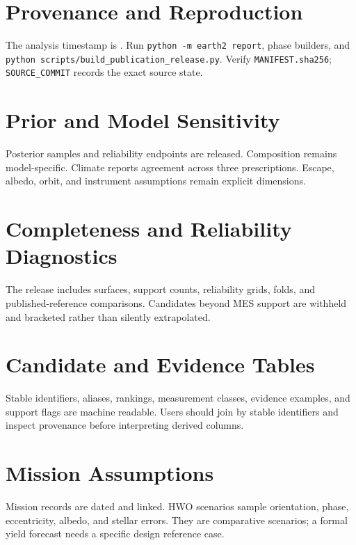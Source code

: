 \documentclass[11pt]{article}
\begin{document}
\section{Provenance and Reproduction}
The analysis timestamp is \texttt{\AnalysisTimestamp}. Run
\texttt{python -m earth2 report}, phase builders, and
\texttt{python scripts/build\_publication\_release.py}. Verify
\texttt{MANIFEST.sha256}; \texttt{SOURCE\_COMMIT} records the exact source state.

\section{Prior and Model Sensitivity}
Posterior samples and reliability endpoints are released. Composition remains
model-specific. Climate reports agreement across three prescriptions. Escape,
albedo, orbit, and instrument assumptions remain explicit dimensions.

\section{Completeness and Reliability Diagnostics}
The release includes surfaces, support counts, reliability grids, folds, and
published-reference comparisons. Candidates beyond MES support are withheld and
bracketed rather than silently extrapolated.

\section{Candidate and Evidence Tables}
Stable identifiers, aliases, rankings, measurement classes, evidence examples,
and support flags are machine readable. Users should join by stable identifiers
and inspect provenance before interpreting derived columns.

\section{Mission Assumptions}
Mission records are dated and linked. HWO scenarios sample orientation, phase,
eccentricity, albedo, and stellar errors. They are comparative scenarios; a
formal yield forecast needs a specific design reference case.



\end{document}
